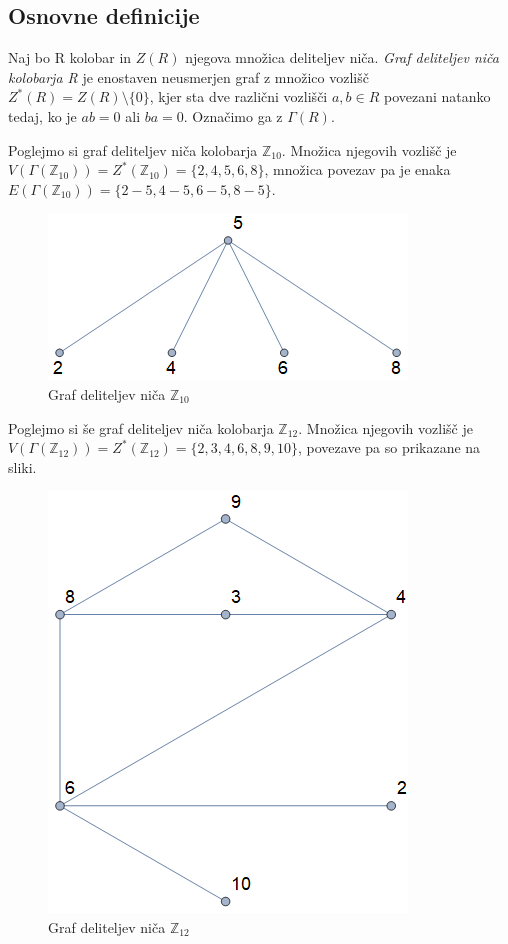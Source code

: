 \documentclass[mat1, tisk]{fmfdelo}
\newcommand{\Z}{\mathbb Z}
\begin{document}
\subsection{Osnovne definicije}
%
\begin{definicija}
  Naj bo R kolobar in $Z(R)$ njegova množica deliteljev niča.
  \emph{Graf deliteljev niča kolobarja R} je enostaven neusmerjen graf z množico
  vozlišč $Z^{*}(R) = Z(R)\setminus\{0\} $, kjer sta dve različni vozlišči $a,b \in R $
  povezani natanko tedaj, ko je $ab = 0$ ali $ba = 0$. Označimo ga z $\Gamma(R)$.
\end{definicija}
%
\begin{zgled}\label{prim1}
  Poglejmo si graf deliteljev niča kolobarja $\Z_{10}$. Množica njegovih vozlišč je 
  $V(\Gamma(\Z_{10})) = Z^{*}(\Z_{10}) = \{2, 4, 5, 6, 8\}$, množica povezav pa 
  je enaka $E(\Gamma(\Z_{10})) = \{2 - 5, 4 - 5, 6 - 5, 8 - 5\}$.
  \begin{figure}[H]
    \centering
    \includegraphics[scale=0.5]{z10.png}
    \caption{Graf deliteljev niča $\Z_{10}$}
  \end{figure}
\end{zgled}
%
\begin{zgled}\label{zgled2.3}
  Poglejmo si še graf deliteljev niča kolobarja $\Z_{12}$. Množica njegovih vozlišč je 
  $V(\Gamma(\Z_{12})) = Z^{*}(\Z_{12}) = \{2, 3, 4, 6, 8, 9, 10\}$, povezave pa so 
  prikazane na sliki.
  \begin{figure}[H]
    \centering
    \includegraphics[scale=0.5]{z12.png}
    \caption{Graf deliteljev niča $\Z_{12}$}
  \end{figure}
\end{zgled}
\end{document}
